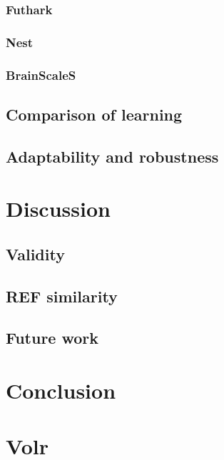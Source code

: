 \documentclass[a4paper,oneside]{memoir}
\begin{document}
  \subsection{Futhark}
  \subsection{Nest}
  \subsection{BrainScaleS}
  \section{Comparison of learning}
  \section{Adaptability and robustness} %

\chapter{Discussion}
  \section{Validity}
  \section{REF similarity}
  \section{Future work}

\chapter{Conclusion}

\printbibliography

\appendix
\chapter{Volr} \label{appendix:volr}
  
\end{document}
